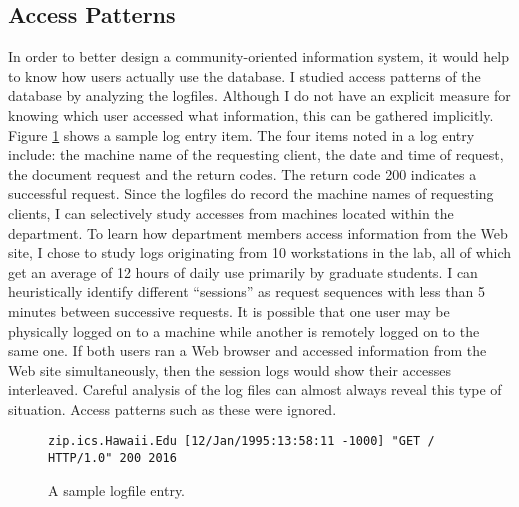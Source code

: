 \subsection{Access Patterns}
In order to better design a community-oriented information system, it would
help to know how users actually use the database.  I studied access patterns of
the database by analyzing the logfiles.  Although I do not have an explicit
measure for knowing which user accessed what information, this can be gathered
implicitly.  Figure \ref{fig:logitem} shows a sample log entry item.  The four
items noted in a log entry include: the machine name of the requesting client,
the date and time of request, the document request and the return codes.  The
return code 200 indicates a successful request.  Since the logfiles do record
the machine names of requesting clients, I can selectively study accesses from
machines located within the department.  To learn how department members access
information from the Web site, I chose to study logs originating from 10
workstations in the lab, all of which get an average of 12 hours of daily use
primarily by graduate students.  I can heuristically identify different
``sessions'' as request sequences with less than 5 minutes between successive
requests.  It is possible that one user may be physically logged on to a
machine while another is remotely logged on to the same one.  If both users ran
a Web browser and accessed information from the Web site simultaneously, then
the session logs would show their accesses interleaved.  Careful analysis of
the log files can almost always reveal this type of situation.  Access patterns
such as these were ignored.

\small
{}
\begin{figure}[htb]
\begin{center}
\begin{verbatim}
zip.ics.Hawaii.Edu [12/Jan/1995:13:58:11 -1000] "GET / HTTP/1.0" 200 2016
\end{verbatim}
\end{center}
\caption{A sample logfile entry.}
\label{fig:logitem}
\end{figure}
\normalsize

